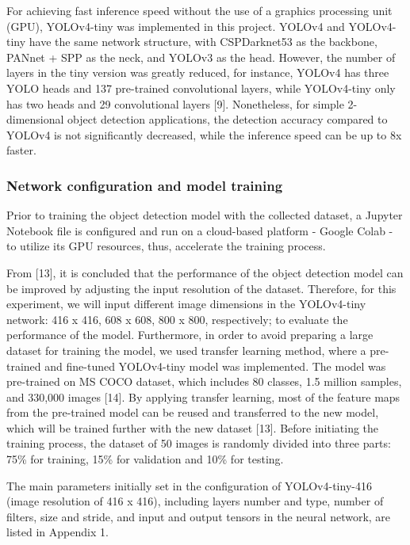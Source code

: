 \documentclass[10pt, letterpaper]{article}
\begin{document}
    For achieving fast inference speed without the use of a graphics processing unit (GPU), YOLOv4-tiny was implemented in this project. YOLOv4 and YOLOv4-tiny have the same network structure, with CSPDarknet53 as the backbone, PANnet + SPP as the neck, and YOLOv3 as the head. However, the number of layers in the tiny version was greatly reduced, for instance, YOLOv4 has three YOLO heads and 137 pre-trained convolutional layers, while YOLOv4-tiny only has two heads and 29 convolutional layers [9]. Nonetheless, for simple 2-dimensional object detection applications, the detection accuracy compared to YOLOv4 is not significantly decreased, while the inference speed can be up to 8x faster.\par

\subsubsection*{Network configuration and model training}
    Prior to training the object detection model with the collected dataset, a Jupyter Notebook file is configured and run on a cloud-based platform - Google Colab - to utilize its GPU resources, thus, accelerate the training process.\par
    From [13], it is concluded that the performance of the object detection model can be improved by adjusting the input resolution of the dataset. Therefore, for this experiment, we will input different image dimensions in the YOLOv4-tiny network: 416 x 416, 608 x 608, 800 x 800, respectively; to evaluate the performance of the model. Furthermore, in order to avoid preparing a large dataset for training the model, we used transfer learning method, where a pre-trained and fine-tuned YOLOv4-tiny model was implemented. The model was pre-trained on MS COCO dataset, which includes 80 classes, 1.5 million samples, and 330,000 images [14]. By applying transfer learning, most of the feature maps from the pre-trained model can be reused and transferred to the new model, which will be trained further with the new dataset [13]. Before initiating the training process, the dataset of 50 images is randomly divided into three parts: 75\% for training, 15\% for validation and 10\% for testing.\par
    The main parameters initially set in the configuration of YOLOv4-tiny-416 (image resolution of 416 x 416), including layers number and type, number of filters, size and stride, and input and output tensors in the neural network, are listed in Appendix 1.\par
\end{document}

